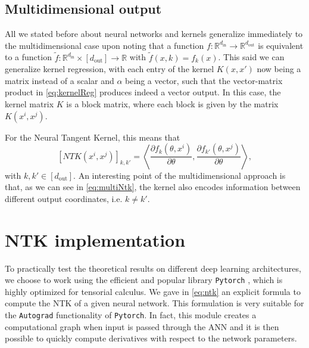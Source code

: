 \documentclass[11pt,notitlepage]{article}
\numberwithin{equation}{section}
\def\R{{\mathbb{R}}}
\theoremstyle{remark}
\theoremstyle{definition}
\begin{document}
	\subsection{Multidimensional output}
	
	All we stated before about neural networks and kernels generalize immediately to the multi\-dimensional case upon noting that a function $f : \R^{d_\text{in}} \rightarrow \R^{d_\text{out}}$ is equivalent to a function $\tilde{f} : \R^{d_\text{in}} \times [d_\text{out}] \rightarrow \R$ with $\tilde{f}(x, k) = f_k(x)$.
	This said we can generalize kernel regression, with each entry of the kernel $K(x, x')$ now being a matrix instead of a scalar and $\alpha$ being a vector, such that the vector-matrix product in \eqref{eq:kernelReg} produces indeed a vector output.
	In this case, the kernel matrix $K$ is a block matrix, where each block is given by the matrix $K(x^i, x^j)$.
	
	For the Neural Tangent Kernel, this means that 
	\begin{equation}\label{eq:multiNtk}
	[NTK(x^i,x^j)]_{k, k'} = \left\langle \frac{\partial f_k (\theta, x^i)}{\partial \theta}, \frac{\partial f_{k'} (\theta, x^j)}{\partial \theta} \right\rangle,
	\end{equation}
	with $k,k' \in [d_\text{out}]$.
	An interesting point of the multidimensional approach is that, as we can see in \eqref{eq:multiNtk}, the kernel also encodes information between different output coordinates, i.e. $k \neq k'$.
	
	
	\section{NTK implementation}\label{sec:implementation}
	
	To practically test the theoretical results on different deep learning architectures, we choose to work using the efficient and popular library \verb|Pytorch| \cite{pytorch}, which is highly optimized for tensorial calculus.
	We gave in \eqref{eq:ntk} an explicit formula to compute the NTK of a given neural network.
	This formulation is very suitable for the \verb|Autograd| functionality of \verb|Pytorch|.
	In fact, this module creates a computational graph when input is passed through the ANN and it is then possible to quickly compute derivatives with respect to the network parameters.
	
\end{document}
